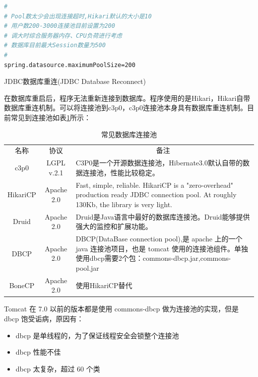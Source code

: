 \documentclass[12pt]{book}
\makeatletter
\numberwithin{dummy}{section}
\theoremstyle{ocrenumbox}
\theoremstyle{blacknumex}
\theoremstyle{blacknumbox}
\theoremstyle{ocrenum}
\renewcommand{\subsection}{\@startsection {subsection}{2}{\z@}
	{-3ex \@plus -0.1ex \@minus -.4ex}
	{0.5ex \@plus.2ex }
	{\normalfont\sffamily\bfseries}}
\makeatother
\begin{document}
\begin{lstlisting}[language=Bash]
#
# Pool数太少会出现连接超时,Hikari默认的大小是10
# 用户数200-3000连接池目前设置为200
# 调大时综合服务器内存、CPU负荷进行考虑
# 数据库目前最大Session数量为500
#
spring.datasource.maximumPoolSize=200
\end{lstlisting}


\subsection{JDBC数据库重连(JDBC Database Reconnect)}

在数据库重启后，程序无法重新连接到数据库。程序使用的是Hikari，Hikari自带数据库重连机制。可以将连接池到c3p0，c3p0连接池本身具有数据库重连机制。目前常见到连接池如表\ref{table:databaseconnectionpool}所示：

\begin{table}
	\caption{常见数据库连接池}
	\label{table:databaseconnectionpool}
	\begin{center}
	\begin{tabular}{|c|c|p{7cm}|}
		\hline
		\multirow{1}{*}{名称}
		& \multicolumn{1}{c|}{协议} 
		& \multicolumn{1}{c|}{备注}\\			
		\cline{1-3}
		c3p0 &  LGPL v.2.1  & C3P0是一个开源数据连接池，Hibernate3.0默认自带的数据连接池，性能比较稳定。\\
		\hline
		HikariCP & Apache 2.0 & Fast, simple, reliable. HikariCP is a "zero-overhead" production ready JDBC connection pool. At roughly 130Kb, the library is very light. \\
		\hline
		Druid & Apache 2.0 & Druid是Java语言中最好的数据库连接池。Druid能够提供强大的监控和扩展功能。 \\
		\hline
		DBCP & Apache 2.0 & DBCP(DataBase connection pool),是 apache 上的一个 java 连接池项目，也是 tomcat 使用的连接池组件。单独使用dbcp需要2个包：commons-dbcp.jar,commons-pool.jar \\
		\hline
		BoneCP & Apache 2.0 & 使用HikariCP替代\\
		\hline
	\end{tabular}	
	\end{center}
\end{table}


Tomcat 在 7.0 以前的版本都是使用 commons-dbcp 做为连接池的实现，但是 dbcp 饱受诟病，原因有：

\begin{itemize}
	\item{dbcp 是单线程的，为了保证线程安全会锁整个连接池}
	\item{dbcp 性能不佳}
	\item{dbcp 太复杂，超过 60 个类}
\end{itemize}
\end{document}

